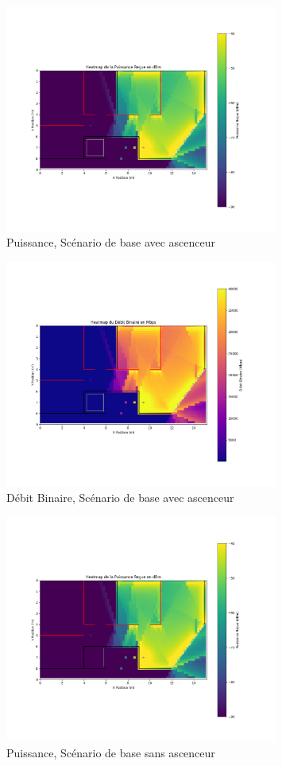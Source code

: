 \begin{figure}[H]
    \centering
    \includegraphics[width=0.8\textwidth]{Pictures/dBm.png}
    \caption{Puissance, Scénario de base avec ascenceur}
    \label{dbmbasea}
\end{figure}
\begin{figure}[H]
    \centering
    \includegraphics[width=0.8\textwidth]{Pictures/mbps.png}
    \caption{Débit Binaire, Scénario de base avec ascenceur}
    \label{mbpsbasea}
\end{figure}
\begin{figure}[H]
    \centering
    \includegraphics[width=0.8\textwidth]{Pictures/bpmsa.png}
    \caption{Puissance, Scénario de base sans ascenceur}
    \label{dbmbasesa}
\end{figure}
